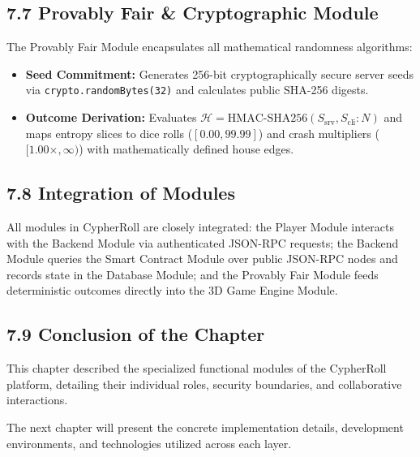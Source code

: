 \subsection*{7.7 Provably Fair \& Cryptographic Module}
The Provably Fair Module encapsulates all mathematical randomness algorithms:
\begin{itemize}[leftmargin=1.5em]
    \item \textbf{Seed Commitment:} Generates 256-bit cryptographically secure server seeds via \texttt{crypto.randomBytes(32)} and calculates public SHA-256 digests.
    \item \textbf{Outcome Derivation:} Evaluates $\mathcal{H} = \text{HMAC-SHA256}(S_{\text{srv}}, S_{\text{cli}} : N)$ and maps entropy slices to dice rolls ($[0.00, 99.99]$) and crash multipliers ($[1.00\times, \infty)$) with mathematically defined house edges.
\end{itemize}

\subsection*{7.8 Integration of Modules}
All modules in CypherRoll are closely integrated: the Player Module interacts with the Backend Module via authenticated JSON-RPC requests; the Backend Module queries the Smart Contract Module over public JSON-RPC nodes and records state in the Database Module; and the Provably Fair Module feeds deterministic outcomes directly into the 3D Game Engine Module.

\subsection*{7.9 Conclusion of the Chapter}
This chapter described the specialized functional modules of the CypherRoll platform, detailing their individual roles, security boundaries, and collaborative interactions.

The next chapter will present the concrete implementation details, development environments, and technologies utilized across each layer.
\label{chap:modules_end}
